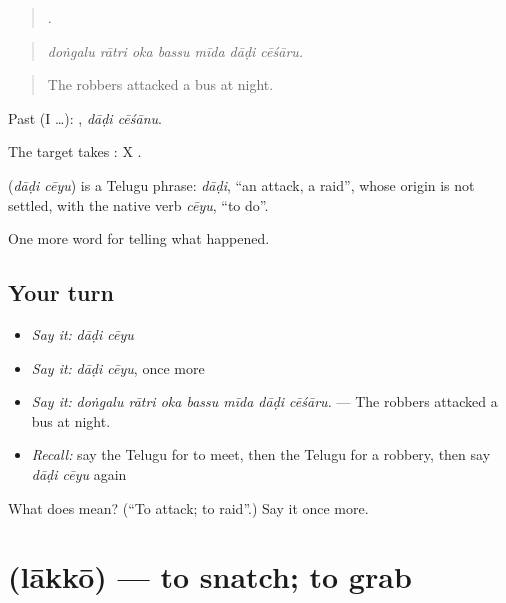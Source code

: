\begin{quote}
      .
\end{quote}

\begin{quote}
\emph{doṅgalu rātri oka bassu mīda dāḍi cēśāru.}
\end{quote}

\begin{quote}
The robbers attacked a bus at night.
\end{quote}

Past (I …):  , \emph{dāḍi cēśānu}.

The target takes : X   .

\begin{cousinweb}
\textbf{ } (\emph{dāḍi cēyu}) is a Telugu phrase: \emph{dāḍi}, \textquotedblleft{}an attack, a raid\textquotedblright{}, whose origin is not settled, with the native verb \emph{cēyu}, \textquotedblleft{}to do\textquotedblright{}.
\end{cousinweb}

\begin{grammarlens}[title={What you've built}]
One more word for telling what happened.
\end{grammarlens}

\subsection*{Your turn}
\begin{itemize}
\raggedright
  \item \emph{Say it:} \emph{dāḍi cēyu}
  \item \emph{Say it:} \emph{dāḍi cēyu}, once more
  \item \emph{Say it:} \emph{doṅgalu rātri oka bassu mīda dāḍi cēśāru.} — The robbers attacked a bus at night.
  \item \emph{Recall:} say the Telugu for to meet, then the Telugu for a robbery, then say \emph{dāḍi cēyu} again
\end{itemize}

\begin{tcolorbox}[breakable,colback=teal!4,colframe=teal!35!black,title={Before you move on}]
What does   mean? (\textquotedblleft{}To attack; to raid\textquotedblright{}.) Say it once more.
\end{tcolorbox}
\section[\texorpdfstring{\te{లాక్కో} (lākkō)}{లాక్కో (lākkō)}]{ (lākkō) — to snatch; to grab}

